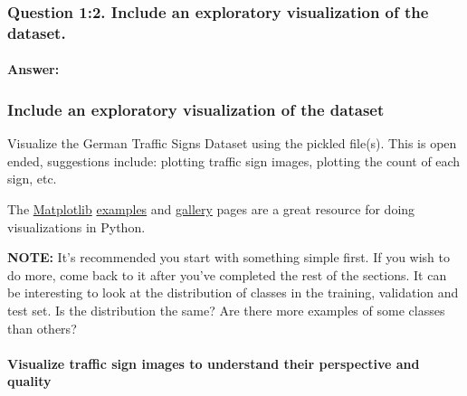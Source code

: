 \documentclass[11pt]{article}
\begin{document}
    \subsubsection{Question 1:2. Include an exploratory visualization of the
dataset.}\label{question-12.-include-an-exploratory-visualization-of-the-dataset.}

    \paragraph{Answer:}\label{answer}

    \subsubsection{Include an exploratory visualization of the
dataset}\label{include-an-exploratory-visualization-of-the-dataset}

    Visualize the German Traffic Signs Dataset using the pickled file(s).
This is open ended, suggestions include: plotting traffic sign images,
plotting the count of each sign, etc.

The \href{http://matplotlib.org/}{Matplotlib}
\href{http://matplotlib.org/examples/index.html}{examples} and
\href{http://matplotlib.org/gallery.html}{gallery} pages are a great
resource for doing visualizations in Python.

\textbf{NOTE:} It's recommended you start with something simple first.
If you wish to do more, come back to it after you've completed the rest
of the sections. It can be interesting to look at the distribution of
classes in the training, validation and test set. Is the distribution
the same? Are there more examples of some classes than others?

    \paragraph{Visualize traffic sign images to understand their perspective
and
quality}\label{visualize-traffic-sign-images-to-understand-their-perspective-and-quality}
\end{document}
